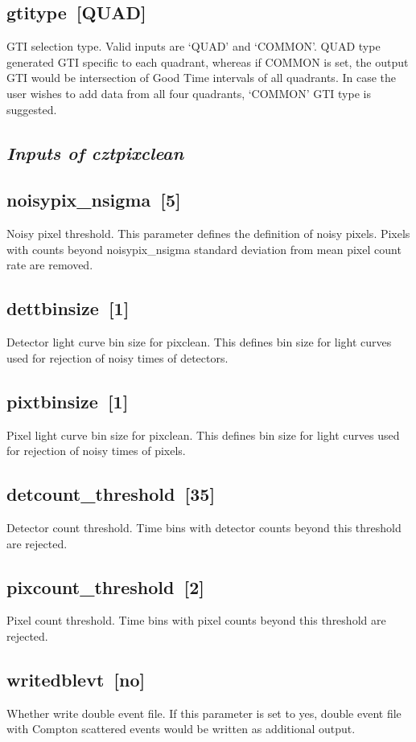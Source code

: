 \documentclass[11pt,oneside,a4paper]{article}
\begin{document}
\subsection*{gtitype~[QUAD]}
    GTI selection type. Valid inputs are `QUAD' and `COMMON'. QUAD type 
generated GTI specific to each quadrant, whereas if COMMON is set, the 
output GTI would be intersection of Good Time intervals of all quadrants. 
In case the user wishes to add data from all four quadrants, `COMMON' GTI 
type is suggested.

\subsection*{\emph{Inputs of cztpixclean}}
    
\subsection*{noisypix\_nsigma~[5]}
    Noisy pixel threshold. This parameter defines the definition of noisy  
pixels. Pixels with counts beyond noisypix\_nsigma standard deviation from 
mean pixel count rate are removed.  
\subsection*{dettbinsize~[1]}
    Detector light curve bin size for pixclean. This defines bin size 
for light curves used for rejection of noisy times of detectors. 
\subsection*{pixtbinsize~[1]}
    Pixel light curve bin size for pixclean. This defines bin size 
for light curves used for rejection of noisy times of pixels.
\subsection*{detcount\_threshold~[35]}
    Detector count threshold. Time bins with detector counts 
beyond this threshold are rejected.
\subsection*{pixcount\_threshold~[2]}
    Pixel count threshold. Time bins with pixel counts 
beyond this threshold are rejected.
\subsection*{writedblevt~[no]}
    Whether write double event file. If this parameter is set to yes, double 
event file with Compton scattered events would be written as additional output.
\end{document}
